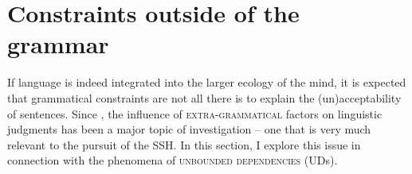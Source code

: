 \documentclass[output=paper,hidelinks]{langscibook}
\begin{document}








\section{Constraints outside of the grammar}\label{ss:sec5}

If language is indeed integrated into the larger ecology of the mind, it is expected that grammatical constraints are not all there is to explain the (un)acceptability of sentences. Since \citet{miller1963finitary}, the influence of  \textsc{extra-grammatical} factors on  linguistic judgments has been a major topic of investigation -- one that is very much relevant to the pursuit of the SSH. In this section, I explore this issue in connection with the phenomena of \textsc{unbounded dependencies} (UDs). 
\end{document}
